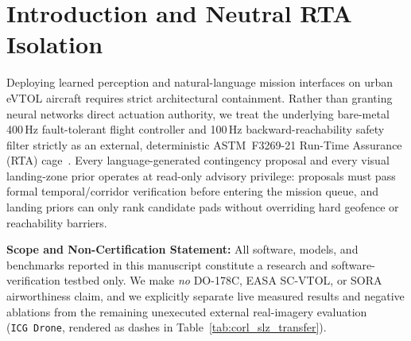 \documentclass[10pt]{article}
\begin{document}
\begin{abstract}
\texttt{GTX~1650~SUPER} via a non-degenerate selector floor ($\mathrm{mIoU}\ge 0.25$) and post-hoc Safe-logit bias ($\delta=-0.2714$), achieving $0.4669$ validation mIoU, $2.81\%$ validation False-Safe Rate, $0.7554$ boundary-compensated OOD AUROC, $0.2468$ quarantined zero-shot \texttt{AeroScapes} mIoU, $0.2259$ quarantined zero-shot \texttt{UAVScenes} mIoU, $100.0\%$ \texttt{XFeat+RANSAC} relocalization pass ($0.218$\,m CEP50), and physical time-sliced edge throughput of $14.13$\,ms p99 ($80.86$\,FPS, $354$\,MiB) in Cruise and $8.72$\,ms mean / $10.11$\,ms p99 ($114.72$\,FPS, $148$\,MiB) in Terminal mode. We make \emph{no} airworthiness certification claim.
\end{abstract}

\section{Introduction and Neutral RTA Isolation}
\label{sec:intro}

Deploying learned perception and natural-language mission interfaces on urban eVTOL aircraft requires strict architectural containment. Rather than granting neural networks direct actuation authority, we treat the underlying bare-metal 400\,Hz fault-tolerant flight controller and 100\,Hz backward-reachability safety filter strictly as an external, deterministic ASTM~F3269-21 Run-Time Assurance (RTA) cage~\cite{astm_f3269_2021,anonymous_rta_cage_2026}. Every language-generated contingency proposal and every visual landing-zone prior operates at read-only advisory privilege: proposals must pass formal temporal/corridor verification before entering the mission queue, and landing priors can only rank candidate pads without overriding hard geofence or reachability barriers.

\textbf{Scope and Non-Certification Statement:} All software, models, and benchmarks reported in this manuscript constitute a research and software-verification testbed only. We make \emph{no} DO-178C, EASA SC-VTOL, or SORA airworthiness claim, and we explicitly separate live measured results and negative ablations from the remaining unexecuted external real-imagery evaluation (\texttt{ICG~Drone}, rendered as dashes in Table~\ref{tab:corl_slz_transfer}).
\end{document}
